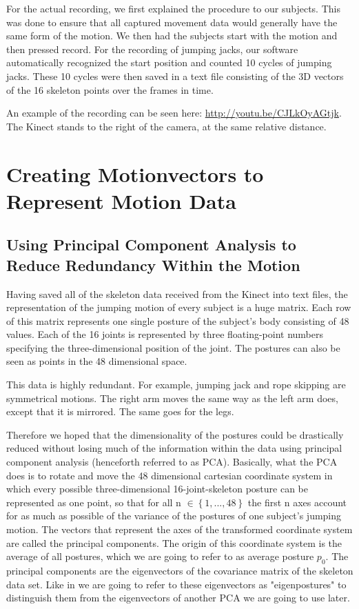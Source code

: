 \documentclass[a4paper]{article}
\begin{document}
For the actual recording, we first explained the procedure to our subjects.
This was done to ensure that all captured movement data would generally have the same form of the motion.
We then had the subjects start with the motion and then pressed record.
For the recording of jumping jacks, our software automatically recognized the start position and counted 10 cycles of jumping jacks.
These 10 cycles were then saved in a text file consisting of the 3D vectors of the 16 skeleton points over the frames in time.

An example of the recording can be seen here: \url{http://youtu.be/CJLkOyAGtjk}. The Kinect stands to the right of the camera, at the same relative distance.

\section{Creating Motionvectors to Represent Motion Data}

\subsection{Using Principal Component Analysis to Reduce Redundancy Within the Motion}

Having saved all of the skeleton data received from the Kinect into text files, the representation of the jumping motion of every subject is a huge matrix.
Each row of this matrix represents one single posture of the subject's body consisting of 48 values.
Each of the 16 joints is represented by three floating-point numbers specifying the three-dimensional position of the joint.
The postures can also be seen as points in the 48 dimensional space.

This data is highly redundant.
For example, jumping jack and rope skipping are symmetrical motions.
The right arm moves the same way as the left arm does, except that it is mirrored.
The same goes for the legs.

Therefore we hoped that the dimensionality of the postures could be drastically reduced without losing much of the information within the data using principal component analysis (henceforth referred to as PCA).
Basically, what the PCA does is to rotate and move the 48 dimensional cartesian coordinate system in which every possible three-dimensional 16-joint-skeleton posture can be represented as one point, so that for all n $\in \left\{1, ..., 48\right\}$ the first n axes account for as much as possible of the variance of the postures of one subject's jumping motion.
The vectors that represent the axes of the transformed coordinate system are called the principal components.
The origin of this coordinate system is the average of all postures, which we are going to refer to as average posture $p_{0}$.
The principal components are the eigenvectors of the covariance matrix of the skeleton data set.
Like in \cite{origin} we are going to refer to these eigenvectors as "eigenpostures" to distinguish them from the eigenvectors of another PCA we are going to use later.
\end{document}
